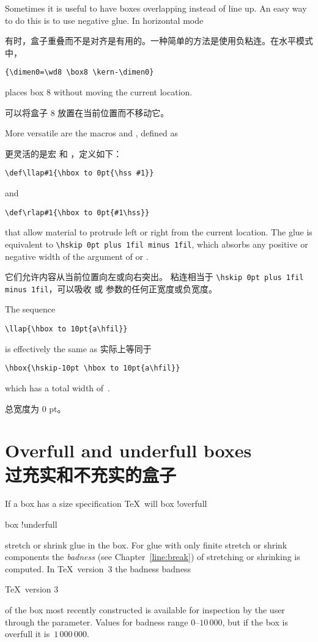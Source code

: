 Sometimes it is useful to have boxes overlapping instead of
\awp
line up. An easy way to do this is to use negative glue.
In horizontal mode

有时，盒子重叠而不是对齐是有用的。一种简单的方法是使用负粘连。在水平模式中，
\begin{verbatim}
{\dimen0=\wd8 \box8 \kern-\dimen0}
\end{verbatim}
places box 8 without moving the current location.

可以将盒子 8 放置在当前位置而不移动它。


More versatile are the macros  and \label{rlap},
defined as 

更灵活的是宏  和 \label{rlap}，定义如下：
\begin{verbatim}
\def\llap#1{\hbox to 0pt{\hss #1}}
\end{verbatim}
and \begin{verbatim}
\def\rlap#1{\hbox to 0pt{#1\hss}}
\end{verbatim}
that allow material to protrude left or right from the
current location.
The  glue is equivalent to \verb>\hskip 0pt plus 1fil minus 1fil>, 
which absorbs any positive or negative width
of the argument of  or .

它们允许内容从当前位置向左或向右突出。
 粘连相当于 \verb>\hskip 0pt plus 1fil minus 1fil>，可以吸收  或  参数的任何正宽度或负宽度。
\begin{example} The sequence \begin{verbatim}
\llap{\hbox to 10pt{a\hfil}}
\end{verbatim}
is effectively the same as 实际上等同于
\begin{verbatim}
\hbox{\hskip-10pt \hbox to 10pt{a\hfil}}
\end{verbatim}
which has a total width of~\n{0pt}.

总宽度为 0 pt。
\end{example}



\section{Overfull and underfull boxes\\过充实和不充实的盒子}
\label{over/underfull}

If a box has a  size specification \TeX\ will
\term box !overfull\par\term box !underfull\par
stretch or shrink glue in the box. For glue with
only finite stretch or shrink components the {\em badness\/}
(see Chapter~\ref{line:break}) of stretching or shrinking
is computed.
In \TeX\ version~3 the badness
\cstoidx badness\par\term \TeX\ version 3\par
of the box most recently
constructed is available for inspection
by the user through the  parameter. Values for
badness range 0--$10\,000$, but if the box is overfull
it is~$1\,000\,000$.

